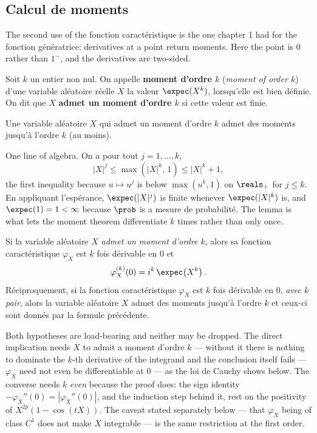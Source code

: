 \subsection{Calcul de moments}

The second use of the fonction caractéristique is the one chapter 1 had for the fonction
génératrice: derivatives at a point return moments. Here the point is $0$ rather than $1^{-}$,
and the derivatives are two-sided.

\begin{definition}[Moment]
Soit $k$ un entier non nul. On appelle \textbf{moment d'ordre $k$} (\textit{moment of order
$k$}) d'une variable aléatoire réelle $X$ la valeur $\expec(X^{k})$, lorsqu'elle est bien
définie. On dit que $X$ \textbf{admet un moment d'ordre $k$} si cette valeur est finie.
\end{definition}

\begin{lemma}
Une variable aléatoire $X$ qui admet un moment d'ordre $k$ admet des moments jusqu'à l'ordre
$k$ (au moins).
\end{lemma}

\begin{remark}
One line of algebra. On a pour tout $j = 1,\dots,k$,
\[
  |X|^{j} \leq \max\!\left(|X|^{k},\,1\right) \leq |X|^{k} + 1,
\]
the first inequality because $u \mapsto u^{j}$ is below $\max(u^{k},1)$ on $\reals_{+}$ for
$j \leq k$. En appliquant l'espérance, $\expec(|X|^{j})$ is finite whenever $\expec(|X|^{k})$
is, and $\expec(1) = 1 < \infty$ because $\prob$ is a mesure de probabilité. The lemma is what
lets the moment theorem differentiate $k$ times rather than only once.
\end{remark}

\begin{theorem}
Si la variable aléatoire $X$ \emph{admet un moment d'ordre $k$}, alors sa fonction
caractéristique $\varphi_{X}$ est $k$ fois dérivable en $0$ et
\[
  \varphi_{X}^{(k)}(0) = i^{k}\,\expec\!\left(X^{k}\right).
\]
Réciproquement, si la fonction caractéristique $\varphi_{X}$ est $k$ fois dérivable en $0$,
\emph{avec $k$ pair}, alors la variable aléatoire $X$ admet des moments jusqu'à l'ordre $k$
et ceux-ci sont donnés par la formule précédente.
\end{theorem}

Both hypotheses are load-bearing and neither may be dropped. The direct implication needs
$X$ to admit a moment d'ordre $k$ --- without it there is nothing to dominate the $k$-th
derivative of the integrand and the conclusion itself fails --- $\varphi_{X}$ need not
even be differentiable at $0$ --- as the loi de Cauchy shows below. The converse needs $k$
\emph{even} because the proof does: the sign identity
$-\varphi_{X}''(0) = \left|\varphi_{X}''(0)\right|$, and the induction step behind it, rest
on the positivity of $X^{2p}\left(1 - \cos(tX)\right)$. The caveat stated separately below ---
that $\varphi_{X}$ being of class $C^{1}$ does not make $X$ integrable --- is the same
restriction at the first order.

